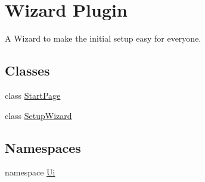 \hypertarget{group___setup}{\section{\-Wizard \-Plugin}
\label{group___setup}
}


\-A \-Wizard to make the initial setup easy for everyone.  


\subsection*{\-Classes}
\begin{DoxyCompactItemize}
\item 
class \hyperlink{class_start_page}{\-Start\-Page}
\item 
class \hyperlink{class_setup_wizard}{\-Setup\-Wizard}
\end{DoxyCompactItemize}
\subsection*{\-Namespaces}
\begin{DoxyCompactItemize}
\item 
namespace \hyperlink{namespace_ui}{\-Ui}
\end{DoxyCompactItemize}
